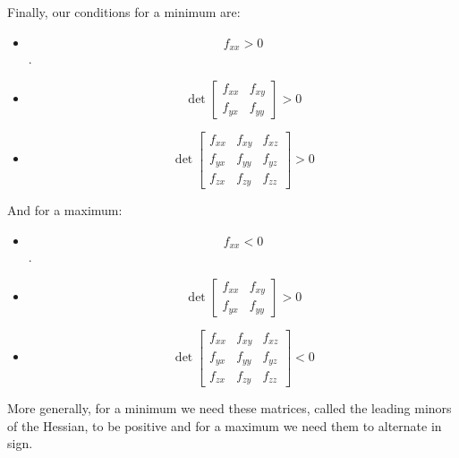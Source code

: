Finally, our conditions for a minimum are:
\begin{itemize}
    \item $$f_{xx} > 0$$.
    \item \[
        \det \begin{bmatrix}
            f_{xx} & f_{xy} \\
            f_{yx} & f_{yy}
        \end{bmatrix} > 0
    \]
    \item \[
        \det \begin{bmatrix}
            f_{xx} & f_{xy} & f_{xz} \\
            f_{yx} & f_{yy} & f_{yz} \\
            f_{zx} & f_{zy} & f_{zz}
        \end{bmatrix} > 0
    \]
\end{itemize}

And for a maximum:
\begin{itemize}
    \item $$f_{xx} < 0$$.
    \item \[
        \det \begin{bmatrix}
            f_{xx} & f_{xy} \\
            f_{yx} & f_{yy}
        \end{bmatrix} > 0
    \]
    \item \[
        \det \begin{bmatrix}
            f_{xx} & f_{xy} & f_{xz} \\
            f_{yx} & f_{yy} & f_{yz} \\
            f_{zx} & f_{zy} & f_{zz}
        \end{bmatrix} < 0
    \]
\end{itemize}

More generally, for a minimum we need these matrices, called the leading minors of the Hessian, to be positive and for a maximum we need them to alternate in sign.